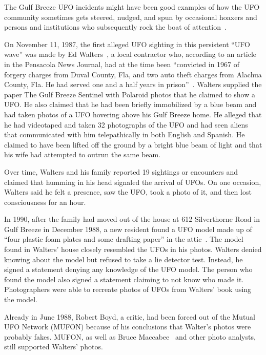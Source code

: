 The Gulf Breeze UFO incidents might have been good examples of how the UFO community sometimes gets steered, nudged, and spun by occasional hoaxers and persons and institutions who subsequently rock the boat of attention~\cite{franck-attention-1999,franck-attention-1993,Davenport2002Sep}.

On November 11, 1987, the first alleged UFO sighting in this persistent ``UFO wave'' was made by Ed Walters~\cite{Walters1991Jan}, a local contractor who, according to an article in the Pensacola News Journal, had at the time been ``convicted in 1967 of forgery charges from Duval County, Fla, and two auto theft charges from Alachua County, Fla. He had served one and a half years in prison''~\cite{PensacolaNewsJournal1990}. Walters supplied the paper The Gulf Breeze Sentinel with Polaroid photos that he claimed to show a UFO.
He also claimed that he had been briefly immobilized by a blue beam and had taken photos of a UFO hovering above his Gulf Breeze home. He alleged that he had videotaped and taken 32 photographs of the UFO and had seen aliens that communicated with him telepathically in both English and Spanish. He claimed to have been lifted off the ground by a bright blue beam of light and that his wife had attempted to outrun the same beam.

Over time, Walters and his family reported 19 sightings or encounters and claimed that humming in his head signaled the arrival of UFOs. On one occasion, Walters said he felt a presence, saw the UFO, took a photo of it, and then lost consciousness for an hour.

In 1990, after the family had moved out of the house at 612 Silverthorne Road in Gulf Breeze in December 1988, a new resident found a UFO model made up of ``four plastic foam plates and some drafting paper'' in the attic~\cite{PensacolaNewsJournal1990MF}. The model found in Walters' house closely resembled the UFOs in his photos. Walters denied knowing about the model but refused to take a lie detector test. Instead, he signed a statement denying any knowledge of the UFO model. The person who found the model also signed a statement claiming to not know who made it. Photographers were able to recreate photos of UFOs from Walters' book using the model.

Already in June 1988, Robert Boyd, a critic, had been forced out of the Mutual UFO Network (MUFON) because of his conclusions that Walter's photos were probably fakes. MUFON, as well as Bruce Maccabee~\cite{Walters1991Jan} and other photo analysts, still supported Walters' photos.

